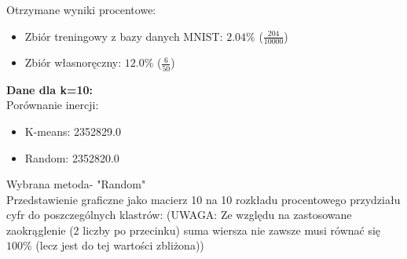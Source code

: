 \documentclass[a4paper,14pt]{report}
\begin{document}
	Otrzymane wyniki procentowe:
	\begin{itemize}
		\item Zbiór treningowy z bazy danych MNIST: $2.04\%$ ($\frac{204}{10000}$)
		\item Zbiór własnoręczny: $12.0\%$ ($\frac{6}{50}$)
	\end{itemize}
	\textbf{Dane dla k=10: } \\
	Porównanie inercji: 
	\begin{itemize}
		\item K-means: 2352829.0
		\item Random: 2352820.0
	\end{itemize}
	Wybrana metoda- "Random" \\
	Przedstawienie graficzne jako macierz 10 na 10 rozkładu procentowego przydziału cyfr do poszczególnych klastrów:
	(UWAGA: Ze względu na zastosowane zaokrąglenie (2 liczby po przecinku) suma wiersza nie zawsze musi równać się $100\%$ (lecz jest do tej wartości zbliżona))
\end{document}
